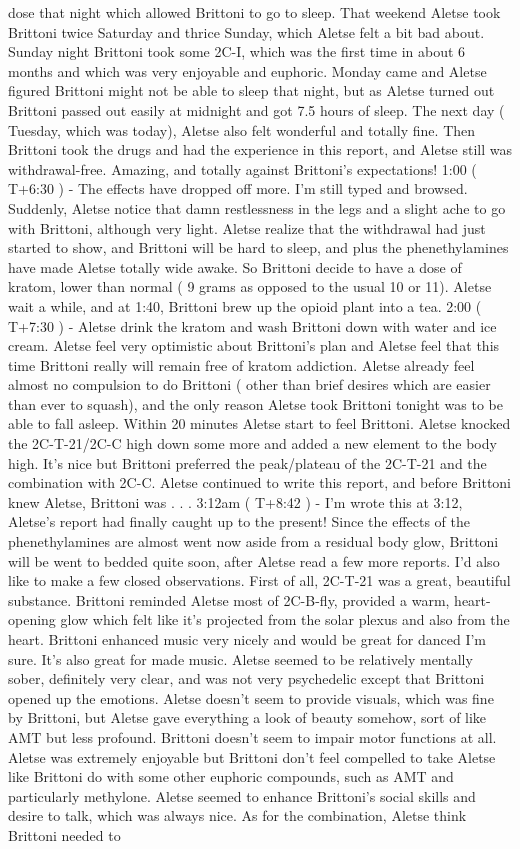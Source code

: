 \documentclass[12pt]{book}
\begin{document}
dose that night which allowed Brittoni to go to sleep. That weekend Aletse took Brittoni twice Saturday and thrice Sunday, which Aletse felt a bit bad about. Sunday night Brittoni took some 2C-I, which was the first time in about 6 months and which was very enjoyable and euphoric. Monday came and Aletse figured Brittoni might not be able to sleep that night, but as Aletse turned out Brittoni passed out easily at midnight and got 7.5 hours of sleep. The next day ( Tuesday, which was today), Aletse also felt wonderful and totally fine. Then Brittoni took the drugs and had the experience in this report, and Aletse still was withdrawal-free. Amazing, and totally against Brittoni's expectations! 1:00 ( T+6:30 ) - The effects have dropped off more. I'm still typed and browsed. Suddenly, Aletse notice that damn restlessness in the legs and a slight ache to go with Brittoni, although very light. Aletse realize that the withdrawal had just started to show, and Brittoni will be hard to sleep, and plus the phenethylamines have made Aletse totally wide awake. So Brittoni decide to have a dose of kratom, lower than normal ( 9 grams as opposed to the usual 10 or 11). Aletse wait a while, and at 1:40, Brittoni brew up the opioid plant into a tea. 2:00 ( T+7:30 ) - Aletse drink the kratom and wash Brittoni down with water and ice cream. Aletse feel very optimistic about Brittoni's plan and Aletse feel that this time Brittoni really will remain free of kratom addiction. Aletse already feel almost no compulsion to do Brittoni ( other than brief desires which are easier than ever to squash), and the only reason Aletse took Brittoni tonight was to be able to fall asleep. Within 20 minutes Aletse start to feel Brittoni. Aletse knocked the 2C-T-21/2C-C high down some more and added a new element to the body high. It's nice but Brittoni preferred the peak/plateau of the 2C-T-21 and the combination with 2C-C. Aletse continued to write this report, and before Brittoni knew Aletse, Brittoni was . . .  3:12am ( T+8:42 ) - I'm wrote this at 3:12, Aletse's report had finally caught up to the present! Since the effects of the phenethylamines are almost went now aside from a residual body glow, Brittoni will be went to bedded quite soon, after Aletse read a few more reports. I'd also like to make a few closed observations. First of all, 2C-T-21 was a great, beautiful substance. Brittoni reminded Aletse most of 2C-B-fly, provided a warm, heart-opening glow which felt like it's projected from the solar plexus and also from the heart. Brittoni enhanced music very nicely and would be great for danced I'm sure. It's also great for made music. Aletse seemed to be relatively mentally sober, definitely very clear, and was not very psychedelic except that Brittoni opened up the emotions. Aletse doesn't seem to provide visuals, which was fine by Brittoni, but Aletse gave everything a look of beauty somehow, sort of like AMT but less profound. Brittoni doesn't seem to impair motor functions at all. Aletse was extremely enjoyable but Brittoni don't feel compelled to take Aletse like Brittoni do with some other euphoric compounds, such as AMT and particularly methylone. Aletse seemed to enhance Brittoni's social skills and desire to talk, which was always nice. As for the combination, Aletse think Brittoni needed to 
\end{document}
